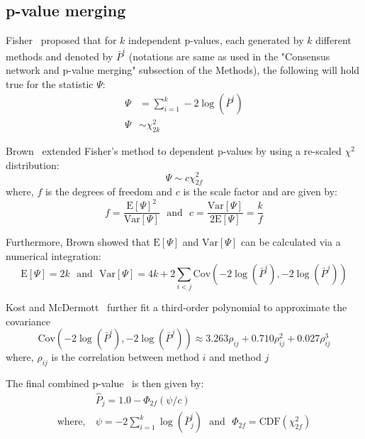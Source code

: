   \subsection*{p-value merging}

  Fisher~\cite{fisher_224a_1948} proposed that for $k$ independent p-values, each generated by $k$ different methods and denoted by $\bar{P}^i$ (notations are same as used in the "Consensus network and p-value merging" subsection of the Methods), the following will hold true for the statistic $\Psi$:
  \begin{equation*}
    \begin{aligned}
      \Psi &= \sum_{i=1}^k -2 \log \left( \bar{P}^i \right) \\
        \Psi &\sim \chi^2_{2k}
    \end{aligned}
  \end{equation*}

  Brown~\cite{brown_400_1975} extended Fisher's method to dependent p-values by using a re-scaled $\chi^2$ distribution:
  \begin{equation*}
    \Psi \sim c \chi^2_{2f}
  \end{equation*}
  where, $f$ is the degrees of freedom and $c$ is the scale factor and are given by:
  \begin{equation*}
    f = \frac{\mathrm{E}[\Psi]^2}{\mathrm{Var}[\Psi]} ~~~\text{and}~~~ c = \frac{\mathrm{Var}[\Psi]}{2\mathrm{E}[\Psi]} = \frac{k}{f}
  \end{equation*}

  Furthermore, Brown showed that $\mathrm{E}[\Psi]$ and $\mathrm{Var}[\Psi]$ can be calculated via a numerical integration:
  \begin{equation*}
    \mathrm{E}[\Psi] = 2k ~~~\text{and}~~~ \mathrm{Var}[\Psi] = 4k + 2\sum_{i<j} \mathrm{Cov}\left( -2\log(\bar{P}^i), -2\log(\bar{P}^j) \right)
  \end{equation*}

  Kost and McDermott~\cite{kost_combining_2002} further fit a third-order polynomial to approximate the covariance
  \begin{equation}
    \mathrm{Cov}\left( -2\log(\bar{P}^i), -2\log(\bar{P}^j) \right) \approx 3.263 \rho_{ij} + 0.710 \rho_{ij}^2 + 0.027 \rho_{ij}^3
    \label{eqn:suppl_covariance-pvalues}
  \end{equation}
  where, $\rho_{ij}$ is the correlation between method $i$ and method $j$

  The final combined p-value~\cite{Poole_Gibbs_Shmulevich_Bernard_Knijnenburg_2016} is then given by:
  \begin{equation}
    \begin{aligned*}
        & \hat{P}_j = 1.0 - \Phi_{2f}\left( \psi / c \right) \\
        \text{where},~ &\psi = -2 \sum_{i=1}^k \log(\bar{P}^i_j) ~~~\text{and}~~~ \Phi_{2f} = \mathrm{CDF}\left( \chi^2_{2f} \right)
    \end{aligned*}
    \label{eqn:suppl_pvalue-combined}
  \end{equation}

